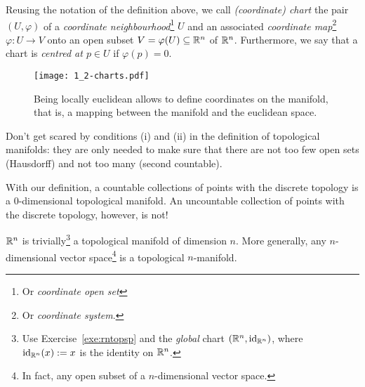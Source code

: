 \begin{notation}\label{def:coords_obj}
  Reusing the notation of the definition above, we call \emph{(coordinate) chart} the pair $(U, \varphi)$ of a \emph{coordinate neighbourhood}\footnote{Or \emph{coordinate open set}} $U$ and an associated \emph{coordinate map}\footnote{Or \emph{coordinate system}.} $\varphi: U\to V$ onto an open subset $V=\varphi(U)\subseteq\mathbb{R}^n$ of $\mathbb{R}^n$.
  Furthermore, we say that a chart is \emph{centred at $p\in U$} if $\varphi(p) = 0$.
\end{notation}

\begin{figure}[htp]
  \centering
  \texttt{[image: 1\_2-charts.pdf]}
  \caption{Being locally euclidean allows to define coordinates on the manifold, that is, a mapping between the manifold and the euclidean space.}
  \label{fig:1.2-charts}
\end{figure}

Don't get scared by conditions (i) and (ii) in the definition of topological manifolds: they are only needed to make sure that there are not too few open sets (Hausdorff) and not too many (second countable).

\begin{example}
  With our definition, a countable collections of points with the discrete topology is a $0$-dimensional topological manifold.
  An uncountable collection of points with the discrete topology, however, is not!
\end{example}

\begin{example}
  $\mathbb{R}^n$ is trivially\footnote{Use Exercise~\ref{exe:rntopsp} and the \emph{global} chart $(\mathbb{R}^n, \operatorname{id}_{\mathbb{R}^n})$, where $\operatorname{id}_{\mathbb{R}^n}(x) := x$ is the identity on $\mathbb{R}^n$.} a topological manifold of dimension $n$.
  More generally, any $n$-dimensional vector space\footnote{In fact, any open subset of a $n$-dimensional vector space.} is a topological $n$-manifold.
\end{example}

